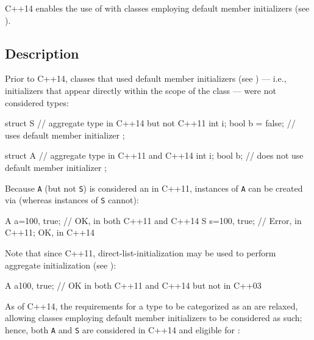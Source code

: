 
\setcounter{table}{0}
\setcounter{footnote}{0}
\setcounter{lstlisting}{0}


C++14 enables the use of  with classes
employing default member initializers (see ).

\subsection[Description]{Description}\label{description}

Prior to C++14, classes that used default member initializers (see ) --- i.e., initializers that appear directly within the
scope of the class --- were not considered  types:

\begin{emcppslisting}[emcppsbatch={e1,e2,e3}]
struct S                // aggregate type in C++14 but not C++11
{
    int i;
    bool b = false;     // uses default member initializer
};

struct A                // aggregate type in C++11 and C++14
{
    int  i;
    bool b;             // does not use default member initializer
};
\end{emcppslisting}

\noindent Because \lstinline!A! (but not \lstinline!S!) is considered an  in
C++11, instances of \lstinline!A! can be created via  (whereas instances of \lstinline!S! cannot):

\begin{emcppslisting}[emcppsbatch=e1]
A a={100, true};  // OK, in both C++11 and C++14
S s={100, true};  // Error, in C++11; OK, in C++14
\end{emcppslisting}


\noindent Note that since C++11, direct-list-initialization may be used to perform aggregate initialization (see ):
\begin{emcppslisting}[emcppsbatch=e2]
A a{100, true};  // OK in both C++11 and C++14 but not in C++03
\end{emcppslisting}
As of C++14, the requirements for a type to be categorized as an
 are relaxed, allowing classes employing default
member initializers to be considered as such; hence, both \lstinline!A! and
\lstinline!S! are considered  in C++14 and eligible for
:

